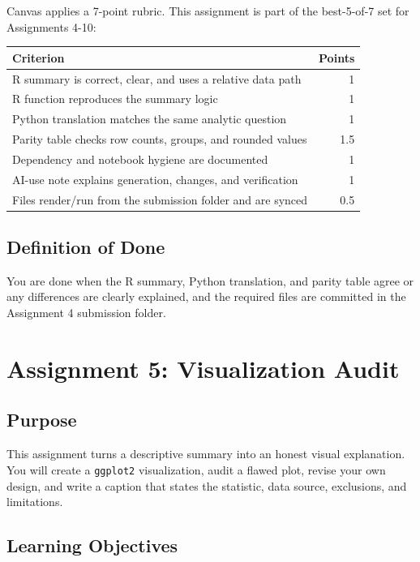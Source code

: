 \documentclass[
  letterpaper,
  DIV=11,
  numbers=noendperiod,
  oneside]{scrreprt}
\begin{document}
Canvas applies a 7-point rubric. This assignment is part of the
best-5-of-7 set for Assignments 4-10:

\begin{longtable}[]{@{}lr@{}}
\toprule\noalign{}
Criterion & Points \\
\midrule\noalign{}
\endhead
\bottomrule\noalign{}
\endlastfoot
R summary is correct, clear, and uses a relative data path & 1 \\
R function reproduces the summary logic & 1 \\
Python translation matches the same analytic question & 1 \\
Parity table checks row counts, groups, and rounded values & 1.5 \\
Dependency and notebook hygiene are documented & 1 \\
AI-use note explains generation, changes, and verification & 1 \\
Files render/run from the submission folder and are synced & 0.5 \\
\end{longtable}

\section{Definition of Done}\label{definition-of-done-13}

You are done when the R summary, Python translation, and parity table
agree or any differences are clearly explained, and the required files
are committed in the Assignment 4 submission folder.

\chapter{Assignment 5: Visualization
Audit}\label{assignment-5-visualization-audit}

\section{Purpose}\label{purpose-7}

This assignment turns a descriptive summary into an honest visual
explanation. You will create a \texttt{ggplot2} visualization, audit a
flawed plot, revise your own design, and write a caption that states the
statistic, data source, exclusions, and limitations.

\section{Learning Objectives}\label{learning-objectives-6}
\end{document}
